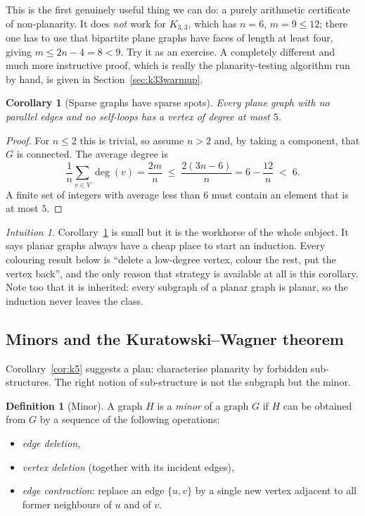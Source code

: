 \documentclass[11pt,a4paper]{article}
\theoremstyle{plain}
\newtheorem{corollary}[theorem]{Corollary}
\theoremstyle{definition}
\newtheorem{definition}[theorem]{Definition}
\theoremstyle{remark}
\newtheorem*{intuition}{Intuition}
\DeclareMathOperator{\dg}{deg}
\begin{document}
This is the first genuinely useful thing we can do: a purely arithmetic
certificate of non-planarity. It does \emph{not} work for $K_{3,3}$, which has
$n = 6$, $m = 9 \le 12$; there one has to use that bipartite plane graphs have
faces of length at least four, giving $m \le 2n - 4 = 8 < 9$. Try it as an
exercise. A completely different and much more instructive proof, which is
really the planarity-testing algorithm run by hand, is given in
Section~\ref{sec:k33warmup}.

\begin{corollary}[Sparse graphs have sparse spots]\label{cor:deg5}
Every plane graph with no parallel edges and no self-loops has a vertex of
degree at most $5$.
\end{corollary}

\begin{proof}
For $n \le 2$ this is trivial, so assume $n > 2$ and, by taking a component,
that $G$ is connected. The average degree is
\[
  \frac{1}{n}\sum_{v \in V} \dg(v) = \frac{2m}{n}
  \;\le\; \frac{2(3n-6)}{n} = 6 - \frac{12}{n} \;<\; 6 .
\]
A finite set of integers with average less than $6$ must contain an element
that is at most $5$.
\end{proof}

\begin{intuition}
Corollary~\ref{cor:deg5} is small but it is the workhorse of the whole
subject. It says planar graphs always have a cheap place to start an
induction. Every colouring result below is ``delete a low-degree vertex,
colour the rest, put the vertex back'', and the only reason that strategy is
available at all is this corollary. Note too that it is inherited: every
subgraph of a planar graph is planar, so the induction never leaves the class.
\end{intuition}

\subsection{Minors and the Kuratowski--Wagner theorem}

Corollary~\ref{cor:k5} suggests a plan: characterise planarity by forbidden
sub-structures. The right notion of sub-structure is not the subgraph but the
minor.

\begin{definition}[Minor]
A graph $H$ is a \emph{minor} of a graph $G$ if $H$ can be obtained from $G$ by
a sequence of the following operations:
\begin{itemize}[nosep]
  \item \emph{edge deletion},
  \item \emph{vertex deletion} (together with its incident edges),
  \item \emph{edge contraction}: replace an edge $\{u,v\}$ by a single new
        vertex adjacent to all former neighbours of $u$ and of $v$.
\end{itemize}
\end{definition}
\end{document}
